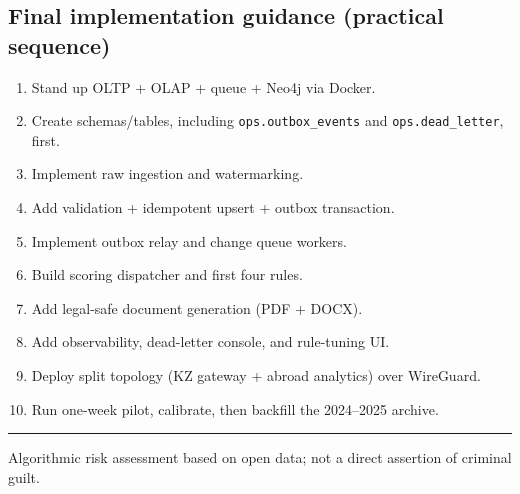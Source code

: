 \documentclass[11pt,a4paper]{article}
\begin{document}
\subsection{Final implementation guidance (practical sequence)}
\begin{enumerate}[leftmargin=1.5em]
  \item Stand up OLTP + OLAP + queue + Neo4j via Docker.
  \item Create schemas/tables, including \texttt{ops.outbox\_events} and \texttt{ops.dead\_letter}, first.
  \item Implement raw ingestion and watermarking.
  \item Add validation + idempotent upsert + outbox transaction.
  \item Implement outbox relay and change queue workers.
  \item Build scoring dispatcher and first four rules.
  \item Add legal-safe document generation (PDF + DOCX).
  \item Add observability, dead-letter console, and rule-tuning UI.
  \item Deploy split topology (KZ gateway + abroad analytics) over WireGuard.
  \item Run one-week pilot, calibrate, then backfill the 2024--2025 archive.
\end{enumerate}

\vspace{1.2em}
\begin{center}
\textcolor{MutedGray}{\rule{0.75\textwidth}{0.4pt}}
\end{center}
\begin{center}
\small\textcolor{MutedGray}{Algorithmic risk assessment based on open data; not a direct assertion of criminal guilt.}
\end{center}
\end{document}
